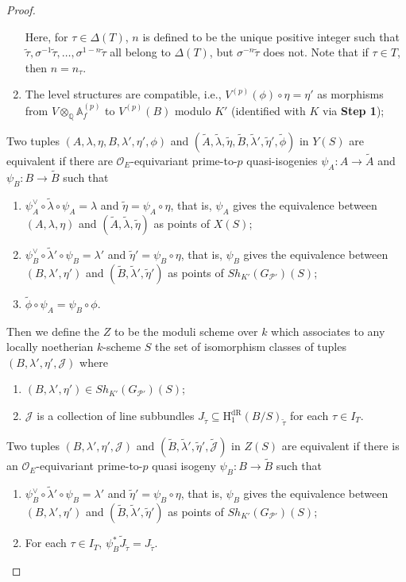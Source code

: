\documentclass{article}
\begin{document}
\begin{proof}
\begin{enumerate}
Here, for $\tau\in\Delta(T)$, $n$ is defined to be the unique positive integer such that $\tilde\tau,\sigma^{-1}\tilde\tau,\ldots,\sigma^{1-n}\tilde\tau$ all belong to $\Delta(T)$, but $\sigma^{-n}\tilde\tau$ does not. Note that if $\tau\in T$, then $n=n_\tau$.
	\item The level structures are compatible, i.e., $V^{(p)}(\phi)\circ \eta=\eta'$ as morphisms from $V\otimes_\mathbb{Q}\mathbb{A}^{(p)}_f$ to $V^{(p)}(B)$ modulo $K'$ (identified with $K$ via \textbf{Step 1});
\end{enumerate}
Two tuples $(A,\lambda,\eta,B,\lambda',\eta',\phi)$ and $(\tilde{A},\tilde\lambda,\tilde\eta,\tilde{B},\tilde\lambda',\tilde\eta',\tilde\phi)$ in $Y(S)$ are equivalent if there are $\mathcal{O}_E$-equivariant prime-to-$p$ quasi-isogenies $\psi_A:A\to \tilde{A}$ and $\psi_B:B\to \tilde{B}$ such that
\begin{enumerate}
	\item $\psi_A^\vee\circ\tilde\lambda\circ\psi_A=\lambda$ and $\tilde\eta=\psi_A\circ\eta$, that is, $\psi_A$ gives the equivalence between $(A,\lambda,\eta)$ and $(\tilde{A},\tilde\lambda,\tilde\eta)$ as points of $X(S)$;
	\item $\psi_B^\vee\circ\tilde\lambda'\circ\psi_B=\lambda'$ and $\tilde\eta'=\psi_B\circ\eta$, that is, $\psi_B$ gives the equivalence between $(B,\lambda',\eta')$ and $(\tilde{B},\tilde\lambda',\tilde\eta')$ as points of $Sh_{K'}(G_{\mathcal{P}'})(S)$;
	\item $\tilde\phi\circ\psi_A=\psi_B\circ\phi$.
\end{enumerate}

Then we define the $Z$ to be the moduli scheme over $k$ which associates to any locally noetherian $k$-scheme $S$ the set of isomorphism classes of tuples $(B,\lambda',\eta',\mathcal{J})$ where
\begin{enumerate}
	\item $(B,\lambda',\eta')\in Sh_{K'}(G_{\mathcal{P}'})(S)$;
	\item $\mathcal{J}$ is a collection of line subbundles $J_{\tilde\tau}\subseteq \text{H}_1^{\text{dR}}(B/S)_{\tilde\tau}$ for each $\tau\in I_T$.
\end{enumerate}
Two tuples $(B,\lambda',\eta',\mathcal{J})$ and $(\tilde{B},\tilde\lambda',\tilde\eta',\tilde{\mathcal{J}})$ in $Z(S)$ are equivalent if there is an $\mathcal{O}_E$-equivariant prime-to-$p$ quasi isogeny $\psi_B:B\to \tilde{B}$ such that
\begin{enumerate}
	\item $\psi_B^\vee\circ\tilde\lambda'\circ\psi_B=\lambda'$ and $\tilde\eta'=\psi_B\circ\eta$, that is, $\psi_B$ gives the equivalence between $(B,\lambda',\eta')$ and $(\tilde{B},\tilde\lambda',\tilde\eta')$ as points of $Sh_{K'}(G_{\mathcal{P}'})(S)$;
	\item For each $\tau\in I_T$, $\psi_B^\ast \tilde{J}_{\tilde\tau}=J_{\tilde\tau}$.
\end{enumerate}


\end{proof}
\end{document}
